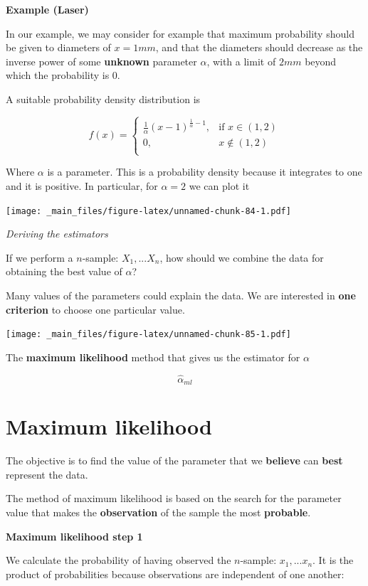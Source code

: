 \documentclass[
]{book}
\begin{document}
\textbf{Example (Laser)}

In our example, we may consider for example that maximum probability should be given to diameters of \(x=1mm\), and that the diameters should decrease as the inverse power of some \textbf{unknown} parameter \(\alpha\), with a limit of \(2mm\) beyond which the probability is \(0\).

A suitable probability density distribution is

\[
    f(x)= 
\begin{cases}
\frac{1}{\alpha}(x-1)^{\frac{1}{\alpha}-1},& \text{if } x \in (1,2)\\
    0,& x \notin (1,2)\\
\end{cases}
\]

Where \(\alpha\) is a parameter. This is a probability density because it integrates to one and it is positive. In particular, for \(\alpha=2\) we can plot it

\texttt{[image: \_main\_files/figure-latex/unnamed-chunk-84-1.pdf]}

\emph{Deriving the estimators}

If we perform a \(n\)-sample: \(X_1,...X_n\), how should we combine the data for obtaining the best value of \(\alpha\)?

Many values of the parameters could explain the data. We are interested in \textbf{one criterion} to choose one particular value.

\texttt{[image: \_main\_files/figure-latex/unnamed-chunk-85-1.pdf]}

The \textbf{maximum likelihood} method that gives us the estimator for \(\alpha\)

\[\hat{\alpha}_{ml}\]

\hypertarget{maximum-likelihood-1}{%
\section{Maximum likelihood}\label{maximum-likelihood-1}}

The objective is to find the value of the parameter that we \textbf{believe} can \textbf{best} represent the data.

The method of maximum likelihood is based on the search for the parameter value that makes the \textbf{observation} of the sample the most \textbf{probable}.

\textbf{Maximum likelihood step 1}

We calculate the probability of having observed the \(n\)-sample: \(x_1,...x_n\). It is the product of probabilities because observations are independent of one another:
\end{document}
